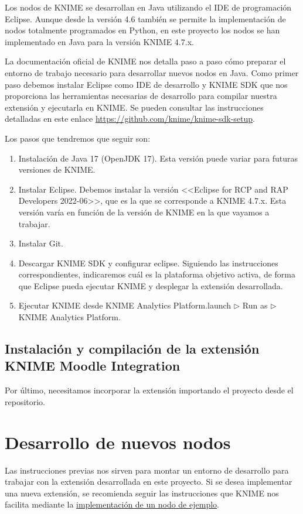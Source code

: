 Los nodos de KNIME se desarrollan en Java utilizando el IDE de programación Eclipse. Aunque desde la versión 4.6 también se permite
 la implementación de nodos totalmente programados en Python, en este proyecto los nodos se han implementado en Java para la versión KNIME 4.7.x. 
\

La documentación oficial de KNIME nos detalla paso a paso cómo preparar el entorno de trabajo necesario para desarrollar
 nuevos nodos en Java. Como primer paso debemos instalar Eclipse como IDE de desarrollo y KNIME SDK que nos proporciona las herramientas 
 necesarias de desarrollo para compilar nuestra extensión y ejecutarla en KNIME. Se pueden consultar las instrucciones detalladas en este enlace \url{https://github.com/knime/knime-sdk-setup}. 
\

Los pasos que tendremos que seguir son:

\begin{enumerate}
	\item Instalación de Java 17 (OpenJDK 17). Esta versión puede variar para futuras versiones de KNIME. 
	\item Instalar Eclipse. Debemos instalar la versión <<Eclipse for RCP and RAP Developers 2022-06>>, que es la que se corresponde a KNIME 4.7.x. 
  Esta versión varía en función de la versión de KNIME en la que vayamos a trabajar. 
	\item Instalar Git. 
	\item Descargar KNIME SDK y configurar eclipse. Siguiendo las instrucciones correspondientes, indicaremos cuál es la plataforma objetivo activa, de forma 
  que Eclipse pueda ejecutar KNIME y desplegar la extensión desarrollada. 
  \item Ejecutar KNIME desde KNIME Analytics Platform.launch $\triangleright$ Run as $\triangleright$ KNIME Analytics Platform. 
\end{enumerate}  


\subsection{Instalación y compilación de la extensión KNIME Moodle Integration}

Por último, necesitamos incorporar la extensión  importando el proyecto desde el repositorio. 
\



\section{Desarrollo de nuevos nodos}

Las instrucciones previas nos sirven para montar un entorno de desarrollo para trabajar con la extensión desarrollada en este proyecto. Si se desea implementar una nueva extensión, 
se recomienda seguir las instrucciones que KNIME nos facilita mediante la \href{https://docs.knime.com/latest/analytics_platform_new_node_quickstart_guide/index.html\#_introduction}{implementación de un nodo de ejemplo}. 

